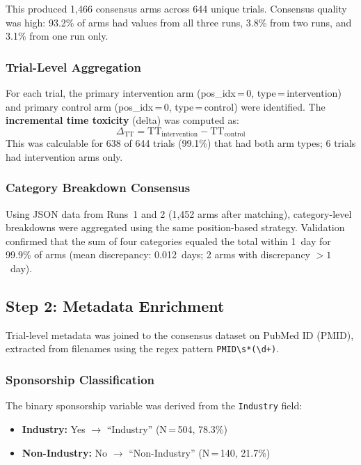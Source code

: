 \documentclass[11pt,a4paper]{article}
\begin{document}
This produced 1{,}466 consensus arms across 644 unique trials. Consensus quality was high: 93.2\% of arms had values from all three runs, 3.8\% from two runs, and 3.1\% from one run only.

\subsubsection{Trial-Level Aggregation}

For each trial, the primary intervention arm (pos\_idx\,=\,0, type\,=\,intervention) and primary control arm (pos\_idx\,=\,0, type\,=\,control) were identified. The \textbf{incremental time toxicity} (delta) was computed as:
\begin{equation}
    \Delta_{\text{TT}} = \text{TT}_{\text{intervention}} - \text{TT}_{\text{control}}
\end{equation}
This was calculable for 638 of 644 trials (99.1\%) that had both arm types; 6 trials had intervention arms only.

\subsubsection{Category Breakdown Consensus}

Using JSON data from Runs~1 and 2 (1{,}452 arms after matching), category-level breakdowns were aggregated using the same position-based strategy. Validation confirmed that the sum of four categories equaled the total within 1~day for 99.9\% of arms (mean discrepancy: 0.012~days; 2 arms with discrepancy $>1$~day).

\subsection{Step 2: Metadata Enrichment}
\label{sec:enrichment}

Trial-level metadata was joined to the consensus dataset on PubMed ID (PMID), extracted from filenames using the regex pattern \texttt{PMID\textbackslash s*(\textbackslash d+)}.

\subsubsection{Sponsorship Classification}

The binary sponsorship variable was derived from the \texttt{Industry} field:
\begin{itemize}
    \item \textbf{Industry:} Yes $\rightarrow$ ``Industry'' (N\,=\,504, 78.3\%)
    \item \textbf{Non-Industry:} No $\rightarrow$ ``Non-Industry'' (N\,=\,140, 21.7\%)
\end{itemize}
\end{document}
